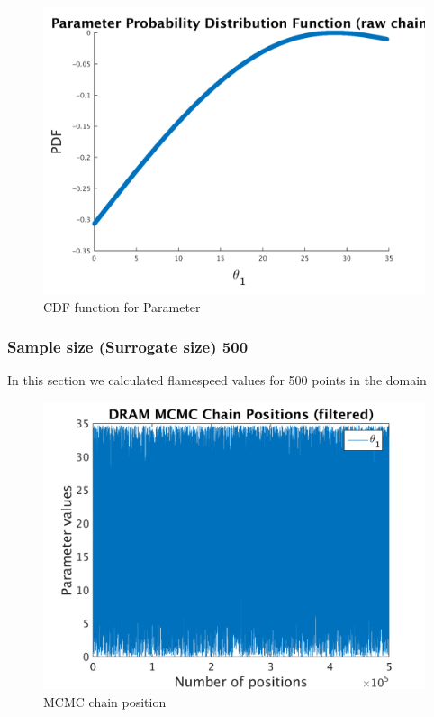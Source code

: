 \begin{figure}[h!]
  
  \centering
   \includegraphics[scale=0.75]{output_100/ip_logLike_unified}
   \caption{CDF function for Parameter }
\end{figure}


\subsubsection{Sample size (Surrogate size) 500 }

In this section we calculated flamespeed values for 500 points in the domain 

\begin{figure}[h!]
  
  \centering
   \includegraphics[scale=0.75]{output_500/simple_ip_chain_pos_filt}
   \caption{MCMC chain position }
\end{figure}



